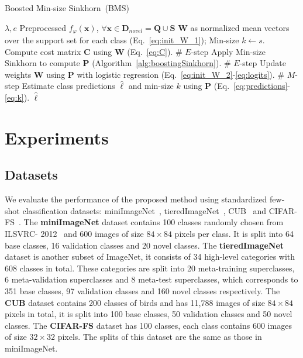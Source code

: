 \documentclass[review]{elsarticle}
\begin{document}
\begin{algorithm}[tb]
   \caption{Boosted Min-size Sinkhorn~(BMS)}
   \label{alg:CSC}
\begin{algorithmic}
    {$\lambda, e$}
    {Preprocessed $f_\varphi(\mathbf{x})$, $\forall\mathbf{x}\in\mathbf{D}_{novel}=\mathbf{Q}\cup\mathbf{S}$}
    $\mathbf{W}$ as normalized mean vectors over the support set for each class (Eq.~\ref{eq:init_W_1}); Min-size $k \leftarrow s$.
   \STATE Compute cost matrix $\mathbf{C}$ using $\mathbf{W}$ (Eq.~\ref{eq:C}). \# $E$-step
   \STATE Apply Min-size Sinkhorn to compute $\mathbf{P}$ (Algorithm~\ref{alg:boostingSinkhorn}). \# $E$-step
   \STATE Update weights $\mathbf{W}$ using $\mathbf{P}$ with logistic regression (Eq.~\ref{eq:init_W_2}-\ref{eq:logits}). \# $M$-step
   \STATE Estimate class predictions $\hat{\ell}$ and min-size $k$ using $\mathbf{P}$ (Eq.~\ref{eq:predictions}-\ref{eq:k}).
   \ENDFOR
{} $\hat{\ell}$
\end{algorithmic}
\end{algorithm}





















\section{Experiments}
\label{experiments}
\subsection{Datasets}

We evaluate the performance of the proposed method using standardized few-shot classification datasets: miniImageNet~\cite{vinyals2016matching}, tieredImageNet~\cite{DBLP:conf/iclr/RenTRSSTLZ18}, CUB~\cite{WahCUB_200_2011} and CIFAR-FS~\cite{DBLP:conf/iclr/BertinettoHTV19}. The \textbf{miniImageNet} dataset contains 100 classes randomly chosen from ILSVRC-
2012~\cite{russakovsky2015imagenet} and 600 images of size $84\times84$ pixels per class. It is split into 64 base classes, 16 validation classes and 20 novel classes. The \textbf{tieredImageNet} dataset is another subset of ImageNet, it consists of 34 high-level categories with 608 classes in total. These categories are split into 20 meta-training superclasses, 6 meta-validation superclasses and 8 meta-test superclasses, which corresponds to 351 base classes, 97 validation classes and 160 novel classes respectively. The \textbf{CUB} dataset contains 200 classes of birds and has 11,788 images of size $84\times84$ pixels in total, it is split into 100 base classes, 50 validation classes and 50 novel classes. The \textbf{CIFAR-FS} dataset has 100 classes, each class contains 600 images of size $32\times32$ pixels. The splits of this dataset are the same as those in miniImageNet.
\end{document}
